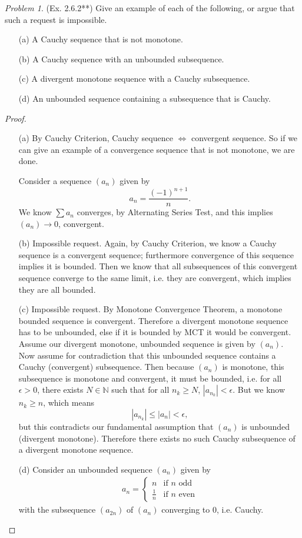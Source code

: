 \documentclass[11pt,twoside, reqno]{amsart}
\theoremstyle{remark}
\newtheorem{Prob}{Problem}
\def\N{\mathbb N}
\renewcommand{\iff}{\Leftrightarrow}
\begin{document}
\begin{Prob}(Ex. 2.6.2**) Give an example of each of the following, or argue that such a request is impossible.
\begin{enumerate}
    \item [(a)] A Cauchy sequence that is not monotone.
    \item [(b)] A Cauchy sequence with an unbounded subsequence.
    \item [(c)] A divergent monotone sequence with a Cauchy subsequence.
    \item [(d)] An unbounded sequence containing a subsequence that is Cauchy.
\end{enumerate}
\end{Prob}

\begin{proof}
\begin{enumerate}
    \item [(a)] By Cauchy Criterion, Cauchy sequence $\iff$ convergent sequence. So if we can give an example of a convergence sequence that is not monotone, we are done.
    
    Consider a sequence $(a_n)$ given by
    $$
        a_n = \frac{(-1)^{n+1}}{n}.
    $$
    We know $\sum a_n$ converges, by Alternating Series Test, and this implies $(a_n) \to 0$, convergent.
    \item [(b)] Impossible request. Again, by Cauchy Criterion, we know a Cauchy sequence is a convergent sequence; furthermore convergence of this sequence implies it is bounded. Then we know that all subsequences of this convergent sequence converge to the same limit, i.e. they are convergent, which implies they are all bounded.
    \item [(c)] Impossible request. By Monotone Convergence Theorem, a monotone bounded sequence is convergent. Therefore a divergent monotone sequence has to be unbounded, else if it is bounded by MCT it would be convergent. Assume our divergent monotone, unbounded sequence is given by $(a_n)$. Now assume for contradiction that this unbounded sequence contains a Cauchy (convergent) subsequence. Then because $(a_n)$ is monotone, this subsequence is monotone and convergent, it must be bounded, i.e. for all $\epsilon > 0$, there exists $N \in \N$ such that for all $n_k \geq N$, $|a_{n_k}| < \epsilon$. But we know $n_k \geq n$, which means
    $$
        |a_{n_k}| \leq |a_n| < \epsilon,
    $$
    but this contradicts our fundamental assumption that $(a_n)$ is unbounded (divergent monotone). Therefore there exists no such Cauchy subsequence of a divergent monotone sequence.
    \item [(d)] Consider an unbounded sequence $(a_n)$ given by
    \begin{align*}
        a_n = 
        \begin{cases}
        n & \text{if $n$ odd}\\
        \frac{1}{n} & \text{if $n$ even}
        \end{cases}
    \end{align*}
    with the subsequence $(a_{2n})$ of $(a_n)$ converging to $0$, i.e. Cauchy.
\end{enumerate}

\end{proof}
\end{document}
